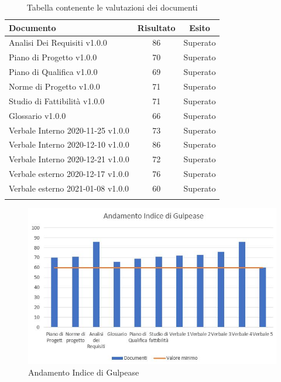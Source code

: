 \documentclass[../piano_di_qualifica.tex]{subfiles}
\begin{document}
\begin{center}
	\begin{longtable}{|l|c|c|}
		\hline
		\rowcolor{lightgray}
            \textbf{Documento} & \textbf{Risultato} &  \textbf{Esito} \\
            \hline 
            Analisi Dei Requisiti v1.0.0 & 86   & Superato \\
            \hline
            \hline 
            Piano di Progetto v1.0.0 & 70 & Superato \\
            \hline 
            Piano di Qualifica v1.0.0 & 69 & Superato \\
            \hline 
            Norme di Progetto v1.0.0 & 71 & Superato \\
            \hline 
            Studio di Fattibilità v1.0.0 & 71 & Superato \\
            \hline 
            Glossario v1.0.0 & 66 & Superato \\
            \hline 
            Verbale Interno 2020-11-25 v1.0.0 & 73 & Superato \\
            \hline 
            Verbale Interno 2020-12-10 v1.0.0 & 86 & Superato \\
            \hline 
            Verbale Interno 2020-12-21 v1.0.0 & 72 & Superato \\
            \hline 
            Verbale esterno 2020-12-17  v1.0.0 & 76 & Superato \\
            \hline
	    Verbale esterno 2021-01-08  v1.0.0 & 60 & Superato \\
            \hline
            \hline

\caption{Tabella contenente le valutazioni dei documenti}
\end{longtable}
\end{center}

\begin{figure}[H]
\centering
\includegraphics[width=12cm]{componenti/media_gul}
\caption{ Andamento Indice di Gulpease}
\end{figure}
\end{document}
